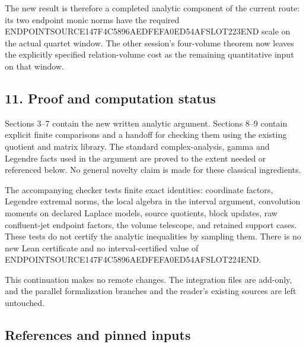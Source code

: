 The new result is therefore a completed analytic component of the current route: its two endpoint monic norms have the required ENDPOINTSOURCE147F4C5896AEDFEFA0ED54AFSLOT223END scale on the actual quartet window. The other session's four-volume theorem now leaves the explicitly specified relation-volume cost as the remaining quantitative input on that window.

\subsection{11. Proof and computation status}\label{endpoint-arithmetic_original--proof-and-computation-status}

Sections 3--7 contain the new written analytic argument. Sections 8--9 contain explicit finite comparisons and a handoff for checking them using the existing quotient and matrix library. The standard complex-analysis, gamma and Legendre facts used in the argument are proved to the extent needed or referenced below. No general novelty claim is made for these classical ingredients.

The accompanying checker tests finite exact identities: coordinate factors, Legendre extremal norms, the local algebra in the interval argument, convolution moments on declared Laplace models, source quotients, block updates, raw confluent-jet endpoint factors, the volume telescope, and retained support cases. These tests do not certify the analytic inequalities by sampling them. There is no new Lean certificate and no interval-certified value of ENDPOINTSOURCE147F4C5896AEDFEFA0ED54AFSLOT224END.

This continuation makes no remote changes. The integration files are add-only, and the parallel formalization branches and the reader's existing sources are left untouched.

\subsection{References and pinned inputs}\label{endpoint-arithmetic_original--references-and-pinned-inputs}

